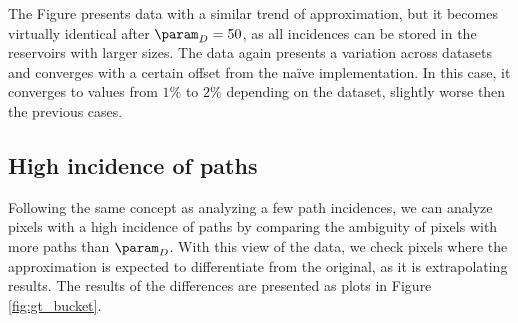 The Figure presents data with a similar trend of approximation, but it becomes virtually identical after $\param_D = 50$, as all incidences can be stored in the reservoirs with larger sizes. The data again presents a variation across datasets and converges with a certain offset from the na\"ive implementation. In this case, it converges to values from $1\%$ to $2\%$ depending on the dataset, slightly worse then the previous cases.

\subsection{High incidence of paths}
\label{subsec:validation_large}

Following the same concept as analyzing a few path incidences, we can analyze pixels with a high incidence of paths by comparing the ambiguity of pixels with more paths than $\param_D$. With this view of the data, we check pixels where the approximation is expected to differentiate from the original, as it is extrapolating results. The results of the differences are presented as plots in Figure \ref{fig:gt_bucket}.

